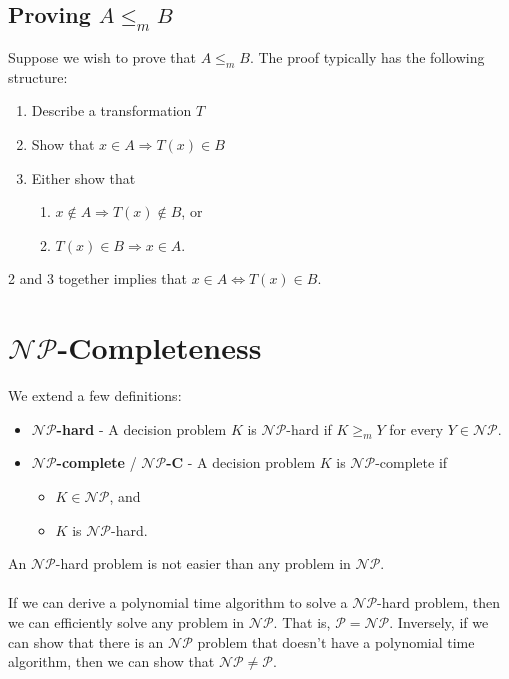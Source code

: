 \documentclass[a4paper]{article}
\begin{document}
\subsection{Proving $A \le_m B$}
Suppose we wish to prove that $A \le_m B$. The proof typically has the following structure:
\begin{enumerate}
	\item Describe a transformation $T$
	\item Show that $x \in A \Rightarrow T(x) \in B$
	\item Either show that 
	\begin{enumerate}
		\item $x \notin A \Rightarrow T(x) \notin B$, or
		\item $T(x) \in B \Rightarrow x \in A$.
	\end{enumerate}
\end{enumerate}
2 and 3 together implies that $x \in A \Leftrightarrow T(x) \in B$.

\section{$\mathcal{NP}$-Completeness}
We extend a few definitions:
\begin{itemize}
	\item[] \textbf{$\mathcal{NP}$-hard} - A decision problem $K$ is $\mathcal{NP}$-hard if $K \ge_m Y$ for every $Y \in \mathcal{NP}$.
	\item[] \textbf{$\mathcal{NP}$-complete} / \textbf{$\mathcal{NP}$-C} - A decision problem $K$ is $\mathcal{NP}$-complete if
	\begin{itemize}
		\item $K \in \mathcal{NP}$, and
		\item $K$ is $\mathcal{NP}$-hard.
	\end{itemize}
\end{itemize}
An $\mathcal{NP}$-hard problem is not easier than any problem in $\mathcal{NP}$.\\\\
If we can derive a polynomial time algorithm to solve a $\mathcal{NP}$-hard problem, then we can efficiently solve any problem in $\mathcal{NP}$. That is, $\mathcal{P}=\mathcal{NP}$. Inversely, if we can show that there is an $\mathcal{NP}$ problem that doesn't have a polynomial time algorithm, then we can show that $\mathcal{NP} \neq \mathcal{P}$.
\end{document}
